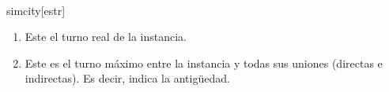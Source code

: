 \begin{Representacion}
~

\begin{Estructura}{simcity}[estr]
    \begin{Tupla}[estr]
    \end{Tupla}%
\end{Estructura}

\begin{Tupla}[union]
\end{Tupla}%

\begin{enumerate}
    \scriptsize
    \item Este el turno real de la instancia.
    \item Este es el turno máximo entre la instancia y todas sus uniones (directas e indirectas). Es decir, indica la antigüedad.
\end{enumerate}



\end{Representacion}
